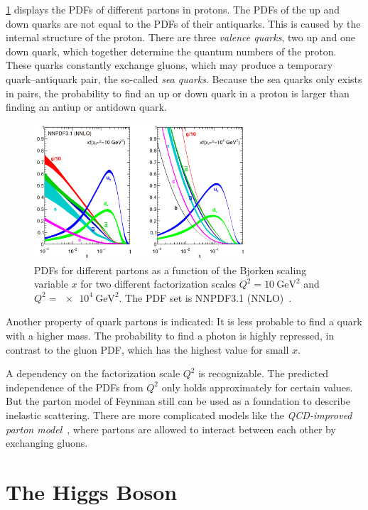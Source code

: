 \cref{fig:theory:pdfs} displays the PDFs of different partons in protons.
The PDFs of the up and down quarks are not equal to the PDFs of their antiquarks.
This is caused by the internal structure of the proton.
There are three \emph{valence quarks}, two up and one down quark, which together determine the quantum numbers of the proton.
These quarks constantly exchange gluons, which may produce a temporary quark--antiquark pair, the so-called \emph{sea quarks}.
Because the sea quarks only exists in pairs, the probability to find an up or down quark in a proton is larger than finding an
antiup or antidown quark.
\begin{figure}[htb]
    \centering
    \includegraphics[width=0.7\textwidth]{./figures/theory/nnpdf.png}
    \caption{PDFs for different partons as a function of the Bjorken scaling variable $x$
             for two different factorization scales $Q^2 = \SI{10}{\GeV\squared}$ and $Q^2 = \SI{e4}{\GeV\squared}$.
             The PDF set is NNPDF3.1 (NNLO)~\cite{nnpdf3.1}.}\label{fig:theory:pdfs}
\end{figure}
Another property of quark partons is indicated: It is less probable to find a quark with a higher mass.
The probability to find a photon is highly repressed, in contrast to the gluon PDF, which has the highest value for small $x$.

A dependency on the factorization scale $Q^2$ is recognizable.
The predicted independence of the PDFs from $Q^2$ only holds approximately for certain values.
But the parton model of Feynman still can be used as a foundation to describe inelastic scattering.
There are more complicated models like the \emph{QCD-improved parton model}~\cite{col98}, where
partons are allowed to interact between each other by exchanging gluons.


\section{The Higgs Boson}\label{sec:theory:higgs}

